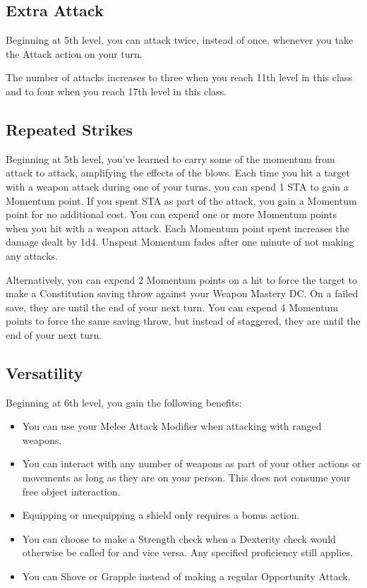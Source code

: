 \subsection{Extra Attack}

Beginning at 5th level, you can attack twice, instead of once, whenever you take the Attack action on your turn.

The number of attacks increases to three when you reach 11th level in this class and to four when you reach 17th level in this class.

\subsection{Repeated Strikes}

Beginning at 5th level, you've learned to carry some of the momentum from attack to attack, amplifying the effects of the blows. Each time you hit a target with a weapon attack during one of your turns, you can spend 1 STA to gain a Momentum point. If you spent STA as part of the attack, you gain a Momentum point for no additional cost. You can expend one or more Momentum points when you hit with a weapon attack. Each Momentum point spent increases the damage dealt by 1d4. Unspent Momentum fades after one minute of not making any attacks.

Alternatively, you can expend 2 Momentum points on a hit to force the target to make a Constitution saving throw against your Weapon Mastery DC. On a failed save, they are  until the end of your next turn. You can expend 4 Momentum points to force the same saving throw, but instead of staggered, they are  until the end of your next turn.

\subsection{Versatility}
Beginning at 6th level, you gain the following benefits:
\begin{itemize}
	\item You can use your Melee Attack Modifier when attacking with ranged weapons.
	\item You can interact with any number of weapons as part of your other actions or movements as long as they are on your person. This does not consume your free object interaction.
	\item Equipping or unequipping a shield only requires a bonus action.
	\item You can choose to make a Strength check when a Dexterity check would otherwise be called for and vice versa. Any specified proficiency still applies.
	\item You can Shove or Grapple instead of making a regular Opportunity Attack.
\end{itemize} 

